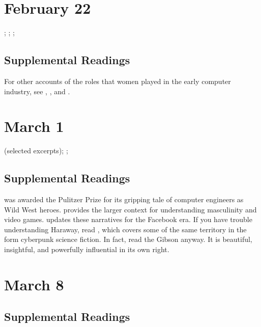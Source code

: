 \documentclass[11pt]{article}
\begin{document}
\section{February 22}
\label{sec:org7301251}

; ; ;

\subsection{Supplemental Readings}
\label{sec:org04c01ec}

For other accounts of the roles that women played in the early computer
industry, see \cite{Shetterly:2016vl}, \cite{Grier:2005tq}, and
\cite{Gurer:1996it}.

\section{March 1}
\label{sec:orgf9e3bf0}

 (selected excerpts); 
; 

\subsection{Supplemental Readings}
\label{sec:org079b5b5}

\cite{Kidder:1981tj} was awarded the Pulitzer Prize for its gripping
tale of computer engineers as Wild West heroes. \cite{Kocurek:2015cg}
provides the larger context for understanding masculinity and video
games. \cite{Losse:2012um} updates these narratives for the Facebook
era. If you have trouble understanding Haraway, read
\cite{Gibson:1995un}, which covers some of the same territory in the
form cyberpunk science fiction. In fact, read the Gibson anyway. It is
beautiful, insightful, and powerfully influential in its own right.

\section{March 8}
\label{sec:org0e82ce4}


\subsection{Supplemental Readings}
\label{sec:org45c11d3}
\end{document}
